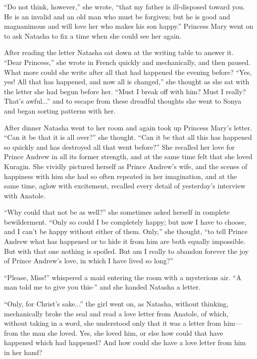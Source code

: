 ``Do not think, however,'' she wrote, ``that my father is
ill-disposed toward you. He is an invalid and an old man who must
be forgiven; but he is good and magnanimous and will love her who
makes his son happy.''  Princess Mary went on to ask Natasha to
fix a time when she could see her again.

After reading the letter Natasha sat down at the writing table to
answer it. ``Dear Princess,'' she wrote in French quickly and
mechanically, and then paused. What more could she write after
all that had happened the evening before? ``Yes, yes! All that
has happened, and now all is changed,'' she thought as she sat
with the letter she had begun before her. ``Must I break off with
him? Must I really? That's awful...'' and to escape from these
dreadful thoughts she went to Sonya and began sorting patterns
with her.

After dinner Natasha went to her room and again took up Princess
Mary's letter. ``Can it be that it is all over?'' she
thought. ``Can it be that all this has happened so quickly and
has destroyed all that went before?'' She recalled her love for
Prince Andrew in all its former strength, and at the same time
felt that she loved Kuragin. She vividly pictured herself as
Prince Andrew's wife, and the scenes of happiness with him she
had so often repeated in her imagination, and at the same time,
aglow with excitement, recalled every detail of yesterday's
interview with Anatole.

``Why could that not be as well?'' she sometimes asked herself in
complete bewilderment. ``Only so could I be completely happy; but
now I have to choose, and I can't be happy without either of
them. Only,'' she thought, ``to tell Prince Andrew what has
happened or to hide it from him are both equally impossible. But
with that one nothing is spoiled. But am I really to abandon
forever the joy of Prince Andrew's love, in which I have lived so
long?''

``Please, Miss!'' whispered a maid entering the room with a
mysterious air. ``A man told me to give you this-'' and she
handed Natasha a letter.

``Only, for Christ's sake...'' the girl went on, as Natasha,
without thinking, mechanically broke the seal and read a love
letter from Anatole, of which, without taking in a word, she
understood only that it was a letter from him---from the man she
loved. Yes, she loved him, or else how could that have happened
which had happened? And how could she have a love letter from him
in her hand?

